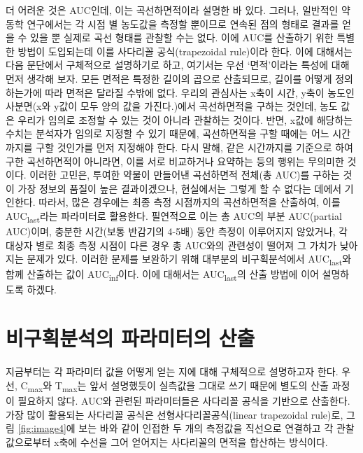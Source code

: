 \documentclass[
  11pt,
  krantz2, a4paper, twoside]{krantz}
\theoremstyle{definition}
\theoremstyle{definition}
\theoremstyle{definition}
\theoremstyle{definition}
\theoremstyle{remark}
\begin{document}
더 어려운 것은 AUC인데, 이는 곡선하면적이라 설명한 바 있다.
그러나, 일반적인 약동학 연구에서는 각 시점 별 농도값을 측정할 뿐이므로 연속된 점의 형태로 결과를 얻을 수 있을 뿐 실제로 곡선 형태를 관찰할 수는 없다. 
이에 AUC를 산출하기 위한 특별한 방법이 도입되는데 이를 사다리꼴 공식(trapezoidal rule)이라 한다.
이에 대해서는 다음 문단에서 구체적으로 설명하기로 하고, 여기서는 우선 `면적'이라는 특성에 대해 먼저 생각해 보자.
모든 면적은 특정한 길이의 곱으로 산출되므로, 길이를 어떻게 정의하는가에 따라 면적은 달라질 수밖에 없다.
우리의 관심사는 x축이 시간, y축이 농도인 사분면(x와 y값이 모두 양의 값을 가진다.)에서 곡선하면적을 구하는 것인데, 농도 값은 우리가 임의로 조정할 수 있는 것이 아니라 관찰하는 것이다.
반면, x값에 해당하는 수치는 분석자가 임의로 지정할 수 있기 때문에, 곡선하면적을 구할 때에는 어느 시간까지를 구할 것인가를 먼저 지정해야 한다.
다시 말해, 같은 시간까지를 기준으로 하여 구한 곡선하면적이 아니라면, 이를 서로 비교하거나 요약하는 등의 행위는 무의미한 것이다.
이러한 고민은, 투여한 약물이 만들어낸 곡선하면적 전체(총 AUC)를 구하는 것이 가장 정보의 품질이 높은 결과이겠으나, 현실에서는 그렇게 할 수 없다는 데에서 기인한다.
따라서, 많은 경우에는 최종 측정 시점까지의 곡선하면적을 산출하여, 이를 AUC\textsubscript{last}라는 파라미터로 활용한다.
필연적으로 이는 총 AUC의 부분 AUC(partial AUC)이며, 충분한 시간(보통 반감기의 4-5배) 동안 측정이 이루어지지 않았거나, 각 대상자 별로 최종 측정 시점이 다른 경우 총 AUC와의 관련성이 떨어져 그 가치가 낮아지는 문제가 있다. 
이러한 문제를 보완하기 위해 대부분의 비구획분석에서 AUC\textsubscript{last}와 함께 산출하는 값이 AUC\textsubscript{inf}이다.
이에 대해서는 AUC\textsubscript{last}의 산출 방법에 이어 설명하도록 하겠다.

\hypertarget{uxbe44uxad6cuxd68duxbd84uxc11duxc758-uxd30cuxb77cuxbbf8uxd130uxc758-uxc0b0uxcd9c}{%
\section{비구획분석의 파라미터의 산출}\label{uxbe44uxad6cuxd68duxbd84uxc11duxc758-uxd30cuxb77cuxbbf8uxd130uxc758-uxc0b0uxcd9c}}

지금부터는 각 파라미터 값을 어떻게 얻는 지에 대해 구체적으로 설명하고자 한다.
우선, C\textsubscript{max}와 T\textsubscript{max}는 앞서 설명했듯이 실측값을 그대로 쓰기 때문에 별도의 산출 과정이 필요하지 않다. AUC와 관련된 파라미터들은 사다리꼴 공식을 기반으로 산출한다. 가장 많이 활용되는 사다리꼴 공식은 선형사다리꼴공식(linear trapezoidal rule)로, 그림 \ref{fig:image4}에 보는 바와 같이 인접한 두 개의 측정값을 직선으로 연결하고 각 관찰값으로부터 x축에 수선을 그어 얻어지는 사다리꼴의 면적을 합산하는 방식이다.
\end{document}
